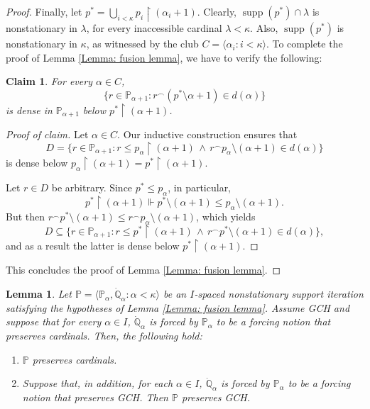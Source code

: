 \documentclass[11pt]{amsart}
\renewcommand{\restriction}{\mathbin\upharpoonright}    %
\newtheorem{claim}{Claim}[theorem]
\newtheorem{lemma}[theorem]{Lemma}
\theoremstyle{definition}
\theoremstyle{remark}
\newcommand\<{{<}}
\DeclareMathOperator{\supp}{supp}
\def\s{\subseteq}
\def\forces{\Vdash}
\newcommand{\po}{\mathbb{P}}
\newcommand{\qo}{\mathbb{Q}}
\newcommand{\la}{\langle}
\newcommand{\ra}{\rangle}
\begin{document}
\begin{proof}
    
    Finally, let $p^* =\bigcup_{i<\kappa} p_i\restriction (\alpha_i+1)$. {Clearly, $\supp(p^*)\cap \lambda$ is nonstationary in $\lambda$, for every inaccessible cardinal $\lambda<\kappa$.} Also, $\supp(p^*)$ is nonstationary in $\kappa$, as witnessed by the club  $C =\langle \alpha_i \colon i<\kappa \rangle$. To complete the proof of Lemma \ref{Lemma: fusion lemma}, we have to verify the following:
    \begin{claim}
     For every $\alpha\in C$, 
    $$\{ r\in \po_{\alpha+1} \colon r^{\smallfrown} (p^*\setminus \alpha+1) \in d(\alpha) \}$$
    is dense in $\po_{\alpha+1}$ below $p^*\restriction (\alpha+1)$.
    \end{claim}
    \begin{proof}[Proof of claim]
        Let $\alpha\in C$. Our inductive construction ensures that $$D=\{r\in \mathbb{P}_{\alpha+1}\colon r\leq p_\alpha\restriction (\alpha+1)\,\wedge\, r{}^\smallfrown p_{\alpha}\setminus (\alpha+1)\in d(\alpha)\}$$
        is dense below $p_{\alpha}\restriction (\alpha+1)=p^*\restriction(\alpha+1).$
        
        Let $r\in D$ be arbitrary. Since $p^*\leq p_\alpha$, in particular,  $$p^*\restriction (\alpha+1)\forces p^*\setminus (\alpha+1)\leq p_\alpha\setminus (\alpha+1).$$
        But then $r{}^\smallfrown p^*\setminus (\alpha+1)\leq r{}^\smallfrown p_\alpha\setminus (\alpha+1)$, which yields
        $$D\s \{r\in \mathbb{P}_{\alpha+1}\colon r\leq p^*\restriction(\alpha+1)\,\wedge\, r{}^\smallfrown p^*\setminus (\alpha+1)\in d(\alpha)\},$$
        and as a result the latter is dense below $p^*\restriction (\alpha+1).$
    \end{proof}
    This concludes the proof of Lemma \ref{Lemma: fusion lemma}.
\end{proof}

\begin{lemma}\label{Lemma: nonstatsupport iterations preserving GCH}
    Let $\po = \la \po_\alpha, \dot{\qo}_\alpha  \colon \alpha<\kappa \ra$ be an $I$-spaced nonstationary support iteration satisfying the hypotheses of Lemma \ref{Lemma: fusion lemma}. Assume {\rm{GCH}} and suppose that for every $\alpha\in I$, $\dot{\qo}_\alpha$ is forced by $\po_\alpha$ to be a forcing notion that preserves cardinals. Then, the following hold:
    \begin{enumerate}
        \item \label{clause: nonstat iterations are nice 1} $\po$ preserves cardinals.
        \item \label{clause: nonstat iterations are nice 2} Suppose that, in addition, for each $\alpha\in I$, $\dot{\qo}_\alpha$ is forced by $\po_\alpha$ to be a forcing notion that preserves {\rm{GCH}}. Then $\po$ preserves {\rm{GCH}}.
    \end{enumerate}
\end{lemma}
\end{document}
